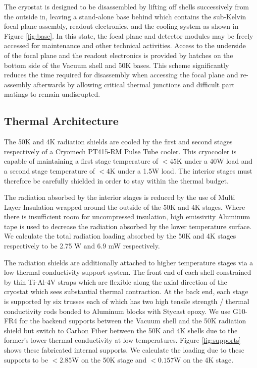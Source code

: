 \documentclass[]{spie}  %
\begin{document}
The cryostat is designed to be disassembled by lifting off shells successively
from the outside in, leaving a stand-alone base behind which contains the
sub-Kelvin focal plane assembly, readout electronics, and the cooling system as shown in Figure
\ref{fig:base}. In this state, the focal plane and detector modules may be
freely accessed for maintenance and other technical activities. Access to the
underside of the focal plane and the readout electronics is provided by
hatches on the bottom side of the Vacuum shell and 50K bases. This scheme
significantly reduces the time required for disassembly when accessing the
focal plane and re-assembly afterwards by allowing critical thermal junctions
and difficult part matings to remain undisrupted.



\subsection{Thermal Architecture}


 The 50K and 4K radiation shields are cooled by the first
and second stages respectively of a Cryomech PT415-RM Pulse Tube cooler. This
cryocooler is capable of maintaining a first stage temperature of $<45$K under
a 40W load and a second stage temperature of $<4$K under a
1.5W load. The interior stages must therefore be carefully shielded in order
to stay within the thermal budget. 


The radiation absorbed by the interior stages is reduced by the use of Multi
Layer Insulation wrapped around the outside of the 50K and 4K stages. Where
there is insufficient room for uncompressed insulation, high emissivity
Aluminum tape is used to decrease the radiation absorbed by the lower
temperature surface. We calculate the total radiation loading absorbed by the
50K and 4K stages respectively to be 2.75 W and 6.9 mW respectively.


The radiation shields are additionally attached to higher temperature stages
via a low thermal conductivity support system. The front end of each shell
constrained by thin Ti-Al-4V straps which are flexible along the axial
direction of the cryostat which sees substantial thermal contraction. At the
back end, each stage is supported by six trusses each of which has two high
tensile strength / thermal conductivity rods bonded to Aluminum blocks with
Stycast epoxy. We use G10-FR4 for the backend supports between the Vacuum
shell and the 50K radiation shield but switch to Carbon Fiber between the 50K
and 4K shells due to the former's lower thermal conductivity at low
temperatures. Figure \ref{fig:supports} shows these fabricated internal
supports. We calculate the loading due to these supports to be $<2.85$W on the
50K stage and $<0.157$W on the 4K stage. 
\end{document}
